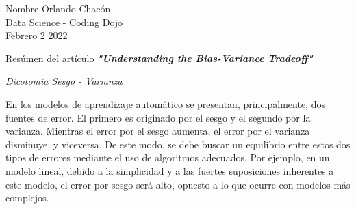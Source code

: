 \documentclass[12pt]{article}
\begin{document}
\begin{flushleft}

Nombre Orlando Chacón\\
Data Science - Coding Dojo\\
Febrero 2 2022\\


\begin{center}
Resúmen del artículo \textbf{\emph{"Understanding the Bias-Variance Tradeoff"}} \cite{bias-variance}

\emph{Dicotomía Sesgo - Varianza}
\end{center}


\setlength{\parindent}{0.5in}

En los modelos de aprendizaje automático se presentan, principalmente, dos fuentes de error. El primero es originado por el sesgo y el segundo por la varianza. Mientras el error por el sesgo aumenta, el error por el varianza disminuye, y viceversa. De este modo, se debe buscar un equilibrio entre estos dos tipos de errores mediante el uso de algoritmos adecuados. Por ejemplo, en un modelo lineal, debido a la simplicidad y a las fuertes suposiciones inherentes a este modelo, el error por sesgo será alto, opuesto a lo que ocurre con modelos más complejos.




\appendix

\end{flushleft}
\end{document}
